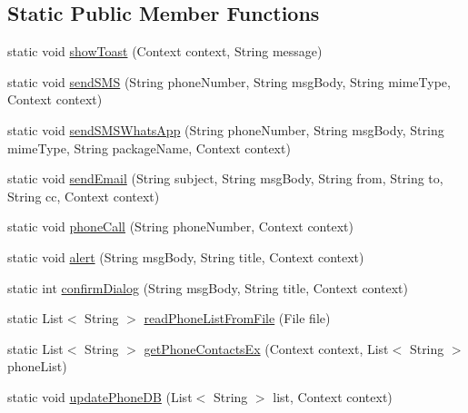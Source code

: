 \subsection*{Static Public Member Functions}
\begin{DoxyCompactItemize}
\item 
static void \hyperlink{classcourse_1_1examples_1_1phoneapp_1_1_utility_a79e295a2526fd5fa44894beeca99f340}{show\+Toast} (Context context, String message)
\item 
static void \hyperlink{classcourse_1_1examples_1_1phoneapp_1_1_utility_a5f33366b0ef1f6e6cc3e25c35dc1e0b6}{send\+S\+M\+S} (String phone\+Number, String msg\+Body, String mime\+Type, Context context)
\item 
static void \hyperlink{classcourse_1_1examples_1_1phoneapp_1_1_utility_a8b997770364b4ae7620db3e18716ec2d}{send\+S\+M\+S\+Whats\+App} (String phone\+Number, String msg\+Body, String mime\+Type, String package\+Name, Context context)
\item 
static void \hyperlink{classcourse_1_1examples_1_1phoneapp_1_1_utility_a1435fdd4dd435034a5d866a6d586e68a}{send\+Email} (String subject, String msg\+Body, String from, String to, String cc, Context context)
\item 
static void \hyperlink{classcourse_1_1examples_1_1phoneapp_1_1_utility_a6532b2cd02df1fa71b50362636401628}{phone\+Call} (String phone\+Number, Context context)
\item 
static void \hyperlink{classcourse_1_1examples_1_1phoneapp_1_1_utility_a52a9f17fcb5689b3da8038811ee6abf4}{alert} (String msg\+Body, String title, Context context)
\item 
static int \hyperlink{classcourse_1_1examples_1_1phoneapp_1_1_utility_a01fad705fa764f0d337f90069427ffb5}{confirm\+Dialog} (String msg\+Body, String title, Context context)
\item 
static List$<$ String $>$ \hyperlink{classcourse_1_1examples_1_1phoneapp_1_1_utility_a578fd485bd50d243570a8eed4af04bc9}{read\+Phone\+List\+From\+File} (File file)
\item 
static List$<$ String $>$ \hyperlink{classcourse_1_1examples_1_1phoneapp_1_1_utility_ae5e71d12f8d95b70caba2a3dbceec986}{get\+Phone\+Contacts\+Ex} (Context context, List$<$ String $>$ phone\+List)
\item 
static void \hyperlink{classcourse_1_1examples_1_1phoneapp_1_1_utility_a1e30a36857885efeacdf33996403a26f}{update\+Phone\+D\+B} (List$<$ String $>$ list, Context context)
\item 

\end{DoxyCompactItemize}
